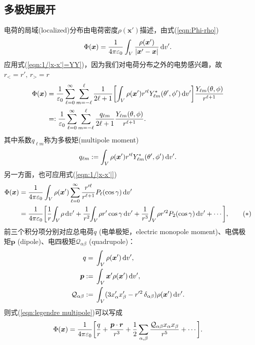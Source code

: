 \subsection{多极矩展开}
电荷的局域(localized)分布由电荷密度$\rho(\bm x')$描述，由式(\ref{eqn:Phi-rho})
\[
    \Phi(\bm x)=\frac1{4\pi\varepsilon_0}\int_V\frac{\rho(\bm x')}{|\bm x'-\bm x|}\mathop{}\!\mathrm{d} v'.
\]
应用式(\ref{eqn:1/|x-x'|=YY})，因为我们对电荷分布之外的电势感兴趣，故$r_<=r',\,r_>=r$
\begin{align}
    \notag
    \Phi(\bm x)&=\frac1{\varepsilon_0}\sum_{\ell=0}^{\infty}\sum_{m=-\ell}^\ell\frac1{2\ell+1}\biggl[\int_V\rho(\bm x'){r'^\ell}Y^\ast_{\ell m}(\theta',\phi')\mathop{}\!\mathrm{d} v'\biggr]\frac{Y_{\ell m}(\theta,\phi)}{r^{\ell+1}}\\
    \label{eqn:Phi multipole}
    &=:\frac1{\varepsilon_0}\sum_{\ell=0}^{\infty}\sum_{m=-\ell}^\ell\frac{q_{\ell m}}{2\ell+1}\frac{Y_{\ell m}(\theta,\phi)}{r^{\ell+1}}.
\end{align}
其中系数$q_{\ell m}$称为多极矩(multipole moment)
\begin{equation}
    q_{\ell m}:=\int_V\rho(\bm x'){r'^\ell}Y^\ast_{\ell m}(\theta',\phi')\mathop{}\!\mathrm{d} v'.
\end{equation}
另一方面，也可应用式(\ref{eqn:1/|x-x'|})
\begin{align}
    \notag
    \Phi(\bm x)&=\frac1{4\pi\varepsilon_0}\int_V\rho(\bm x')\sum\fmto\ell 0\frac{r'^\ell}{r^{\ell+1}}P_\ell(\cos\gamma)\d v'\\
    \label{eqn:legendre multipole}
    &=\frac1{4\pi\varepsilon_0}\biggfkh{\frac1r\bs2\int_V\bs1\rho\d v'+\frac1{r^2}\bs3\int_V\bs1\rho r'\cos\gamma\d v'+\frac1{r^3}\bs3\int_V\bs1\rho r'^2P_2(\cos\gamma)\d v'+\cdots},\tag{$\ast$}
\end{align}
前三个积分项分别对应总电荷$q$ (电单极矩，electric monopole moment)、电偶极矩$\bm p$ (dipole)、电四极矩$\mathcal Q_{\alpha\beta}$ (quadrupole)：
\begin{align}
    \notag
    q={}&\int_V\rho(\bm x')\mathop{}\!\mathrm{d} v',\\
    \bm p:={}&\int_V\bm x'\rho(\bm x')\mathop{}\!\mathrm{d} v',\\
    \mathcal Q_{\alpha\beta}:={}&\int_V(3x_\alpha'x_\beta'-r'^2\mathop{}\!\delta_{\alpha\beta})\rho(\bm x')\mathop{}\!\mathrm{d} v'.
\end{align}
则式(\ref{eqn:legendre multipole})可以写成 
\begin{equation}
    \Phi(\bm x)=\frac1{4\pi\varepsilon_0}\biggl[\frac qr+\frac{\bm p\cdot\bm r}{r^3}+\frac12\sum_{\alpha,\beta}\frac{\mathcal Q_{\alpha\beta}x_\alpha x_\beta}{r^5}+\cdots\biggr].
\end{equation}
